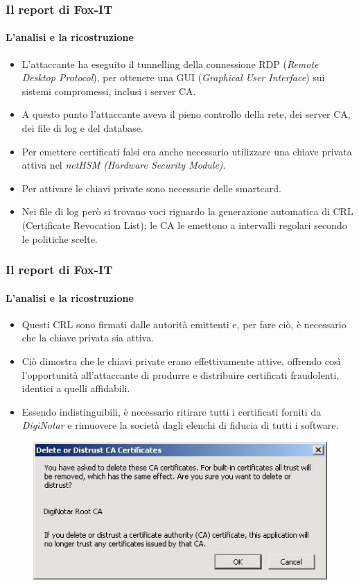 \documentclass{beamer}
\begin{document}
\begin{frame}
\frametitle{Il report di Fox-IT}
\framesubtitle{L'analisi e la ricostruzione}
\begin{itemize}
	\item L'attaccante ha eseguito il tunnelling della connessione \alert{RDP} (\textit{Remote Desktop Protocol}), per ottenere una \alert{GUI} (\textit{Graphical User Interface}) sui sistemi compromessi, inclusi i server CA.
	\item A questo punto l'attaccante aveva il \alert{pieno controllo} della rete, dei server CA, dei file di log e del database.
	\item Per emettere certificati falsi era anche necessario utilizzare una \alert{chiave privata} attiva nel \textit{netHSM (Hardware Security Module)}.
	\item Per attivare le chiavi private sono necessarie delle \alert{smartcard}.
	\item Nei file di log però si trovano voci riguardo la \alert{generazione automatica di CRL} (Certificate Revocation List); le CA le emettono a intervalli regolari secondo le politiche scelte.
\end{itemize}
\end{frame}

\begin{frame}
\frametitle{Il report di Fox-IT}
\framesubtitle{L'analisi e la ricostruzione}
\begin{itemize}
	\item Questi CRL sono firmati dalle autorità emittenti e, per fare ciò, è necessario che la chiave privata sia attiva.
	\item Ciò dimostra che le \alert{chiavi private} erano effettivamente \alert{attive}, offrendo così l'opportunità all'attaccante di produrre e distribuire certificati fraudolenti, identici a quelli affidabili.
	\item Essendo indistinguibili, è necessario \alert{ritirare tutti i certificati} forniti da \textit{DigiNotar} e \alert{rimuovere} la società \alert{dagli elenchi di fiducia} di tutti i software.
\end{itemize}
\begin{figure}[H]
	\centering
	\includegraphics[scale=0.5]{untrust}
\end{figure}
~\\
\end{frame}
\end{document}
